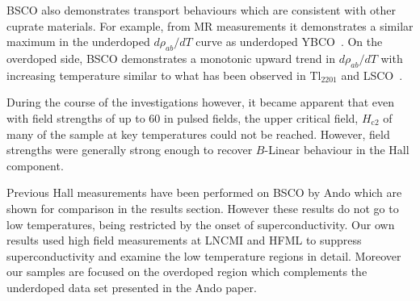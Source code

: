 \ac{BSCO} also demonstrates transport behaviours which are consistent with other \highTc cuprate materials. For example, from \ac{MR} measurements it demonstrates a similar maximum in the underdoped $d\rho_{ab}/dT$ curve as underdoped YBCO~\cite{Ando1999}. On the overdoped side, \ac{BSCO} demonstrates a monotonic upward trend in $d\rho_{ab}/dT$ with increasing temperature similar to what has been observed in Tl$_{2201}$ and \ac{LSCO}~\cite{Ando1999}.

During the course of the investigations however, it became apparent that even with field strengths of up to \unit{60}{\tesla} in pulsed fields, the upper critical field, $H_{\textrm{c2}}$ of many of the sample at key temperatures could not be reached. However, field strengths were generally strong enough to recover $B$-Linear behaviour in the Hall component.

Previous Hall measurements have been performed on \ac{BSCO} by Ando \etal which are shown for comparison in the results section. However these results do not go to low temperatures, being restricted by the onset of superconductivity. Our own results used high field measurements at \ac{LNCMI} and \ac{HFML} to suppress superconductivity and examine the low temperature regions in detail. Moreover our samples are focused on the overdoped region which complements the underdoped data set presented in the Ando paper.





